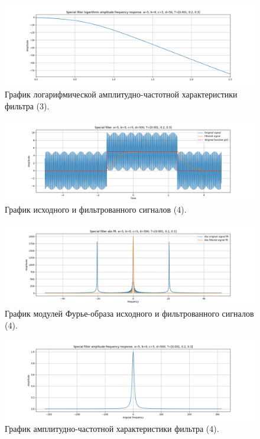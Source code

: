 \documentclass[a4paper, 12pt]{article}
\begin{document}
    \begin{figure}[H]
        \centering
        \includegraphics[scale=0.4]{3_fl2_lafr.png}
        \captionsetup{skip=0pt}
        \caption{График логарифмической амплитудно-частотной характеристики фильтра (3).}
        \label{fig:filinlafr23}
    \end{figure}
    \begin{figure}[H]
        \centering
        \includegraphics[scale=0.4]{4_fl2.png}
        \captionsetup{skip=0pt}
        \caption{График исходного и фильтрованного сигналов (4).}
        \label{fig:filin24}
    \end{figure}
    \begin{figure}[H]
        \centering
        \includegraphics[scale=0.4]{4_fl2_abs.png}
        \captionsetup{skip=0pt}
        \caption{График модулей Фурье-образа исходного и фильтрованного сигналов (4).}
        \label{fig:filinabs24}
    \end{figure}
    \begin{figure}[H]
        \centering
        \includegraphics[scale=0.4]{4_fl2_afr.png}
        \captionsetup{skip=0pt}
        \caption{График амплитудно-частотной характеристики фильтра (4).}
        \label{fig:filinafr24}
    \end{figure}
\end{document}
